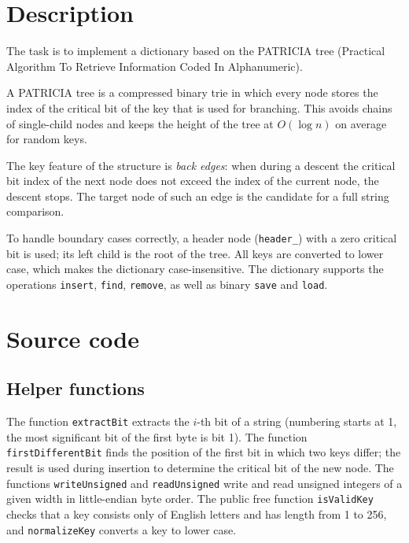 \section{Description}

The task is to implement a dictionary based on the PATRICIA tree (Practical Algorithm To Retrieve
Information Coded In Alphanumeric).

A PATRICIA tree is a compressed binary trie in which every node stores the index of the critical
bit of the key that is used for branching. This avoids chains of single-child nodes and keeps the
height of the tree at $O(\log n)$ on average for random keys.

The key feature of the structure is \textit{back edges}: when during a descent the critical bit
index of the next node does not exceed the index of the current node, the descent stops. The
target node of such an edge is the candidate for a full string comparison.

To handle boundary cases correctly, a header node (\texttt{header\_}) with a zero critical bit is
used; its left child is the root of the tree. All keys are converted to lower case, which makes the
dictionary case-insensitive. The dictionary supports the operations \texttt{insert},
\texttt{find}, \texttt{remove}, as well as binary \texttt{save} and \texttt{load}.

\pagebreak

\section{Source code}

\subsection{Helper functions}

The function \texttt{extractBit} extracts the $i$-th bit of a string (numbering starts at 1, the
most significant bit of the first byte is bit 1). The function \texttt{firstDifferentBit} finds
the position of the first bit in which two keys differ; the result is used during insertion to
determine the critical bit of the new node. The functions \texttt{writeUnsigned} and
\texttt{readUnsigned} write and read unsigned integers of a given width in little-endian byte
order. The public free function \texttt{isValidKey} checks that a key consists only of English
letters and has length from 1 to 256, and \texttt{normalizeKey} converts a key to lower case.

